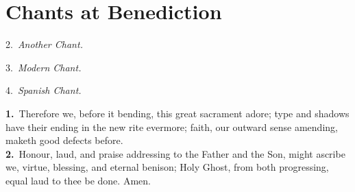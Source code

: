 {
\section{Chants at Benediction}
\def\gabcfolder{../BenedictionChants}

\let\translationmargin=\undefined
\bigskip




{\begin{center}
2.~\emph{Another Chant.}
\end{center}
}


{\begin{center}
3.~\emph{Modern Chant.}
\end{center}
}


{\begin{center}
4.~\emph{Spanish Chant.}
\end{center}
}


\begin{multicols}{2}
\noindent
\textbf{1.}~Therefore we, before it bending,
this great sacrament adore;
type and shadows have their ending
in the new rite evermore;
faith, our outward sense amending,
maketh good defects before.\\
\textbf{2.}~Honour, laud, and praise addressing
to the Father and the Son,
might ascribe we, virtue, blessing,
and eternal benison;
Holy Ghost, from both progressing,
equal laud to thee be done. Amen.
\end{multicols}
\medskip

}
